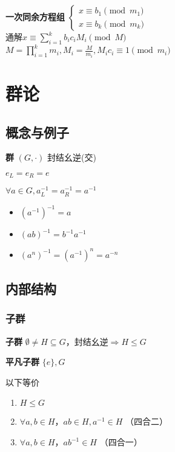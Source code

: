 \documentclass[b4paper, 10pt]{ctexart}
\newcommand*{\impl}{\Rightarrow}
\renewcommand*{\leq}{\leqslant}
\begin{document}
\begin{multicols}{3}
    \textbf{一次同余方程组} $\begin{cases}
            x \equiv b_1 \pmod{m_1} \\
            x \equiv b_k \pmod{m_k}
        \end{cases}$\\
    通解$x \equiv \sum_{i=1}^k b_i c_i M_i \pmod{M}$\\
    $M \! = \! \prod\limits_{i=1}^k m_i, M_i \! = \! \frac{M}{m_i}, M_i c_i \equiv 1 \pmod{m_i}$

    \section{群论}

    \subsection{概念与例子}

    \textbf{群} $(G, \cdot)$ 封结幺逆(交)

    \begin{theorem}[幺元性质]
        $e_L = e_R = e$
    \end{theorem}

    \begin{theorem}[逆元性质]
        $\forall a \in G, a_L^{-1} = a_R^{-1} = a^{-1}$

        \begin{itemize}
            \item $(a^{-1})^{-1} = a$
            \item $(ab)^{-1}=b^{-1}a^{-1}$
            \item $(a^n)^{-1}=(a^{-1})^n=a^{-n}$
        \end{itemize}
    \end{theorem}

    \subsection{内部结构}

    \subsubsection{子群}

    \textbf{子群} $\emptyset \!\neq\! H \!\subseteq\! G$，封结幺逆$\impl H \!\leq\! G$

    \textbf{平凡子群} $\{e\}, G$

    \begin{theorem}[子群判则]
        以下等价
        \begin{enumerate}
            \item $H \leq G$
            \item $\forall a, b \!\in\! H$，$ab \!\in\! H, a^{-1} \!\in\! H$ （四合二）
            \item $\forall a, b \!\in\! H$，$ab^{-1} \!\in\! H$ （四合一）
        \end{enumerate}
    \end{theorem}


\end{multicols}
\end{document}
